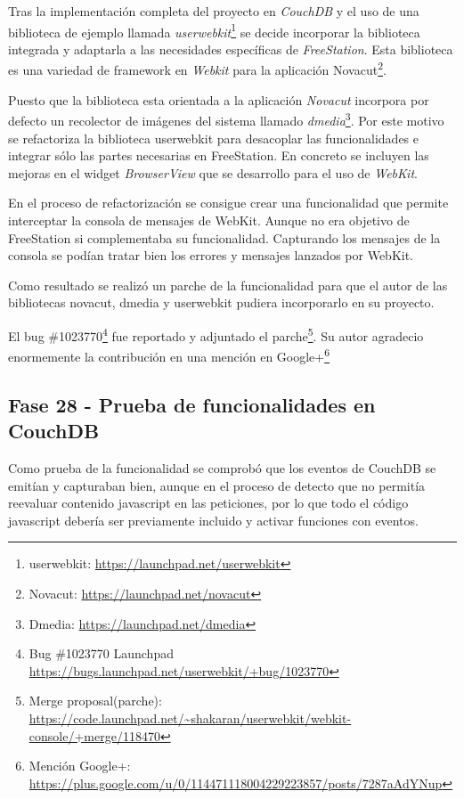 Tras la implementación completa del proyecto en \emph{CouchDB} y el uso de una
biblioteca de ejemplo llamada
\emph{userwebkit}\footnote{userwebkit: \url{https://launchpad.net/userwebkit}}
se decide incorporar la biblioteca integrada y adaptarla a las necesidades
específicas de \emph{FreeStation}.
Esta biblioteca es una variedad de framework en \emph{Webkit} para la aplicación
Novacut\footnote{Novacut: \url{https://launchpad.net/novacut}}.

Puesto que la biblioteca esta orientada a la aplicación \emph{Novacut} incorpora
por defecto un recolector de imágenes del sistema llamado
\emph{dmedia}\footnote{Dmedia: \url{https://launchpad.net/dmedia}}. Por este
motivo se refactoriza la biblioteca userwebkit para desacoplar las
funcionalidades e integrar sólo las partes necesarias en FreeStation. En
concreto se incluyen las mejoras en el widget \emph{BrowserView} que se
desarrollo para el uso de \emph{WebKit}.

En el proceso de refactorización se consigue crear una funcionalidad que permite
interceptar la consola de mensajes de WebKit. Aunque no era objetivo de
FreeStation si complementaba su funcionalidad. Capturando los mensajes de la
consola se podían tratar bien los errores y mensajes lanzados por WebKit.

Como resultado se realizó un parche de la funcionalidad para que el autor de
las bibliotecas novacut, dmedia y userwebkit pudiera incorporarlo en su proyecto.

El bug \#1023770\footnote{Bug \#1023770 Launchpad
\url{https://bugs.launchpad.net/userwebkit/+bug/1023770}} fue reportado y adjuntado el
parche\footnote{Merge proposal(parche): \\
\url{https://code.launchpad.net/~shakaran/userwebkit/webkit-console/+merge/118470}}.
Su autor agradecio enormemente la contribución en una mención en
Google+\footnote{Mención Google+:
\url{https://plus.google.com/u/0/114471118004229223857/posts/7287aAdYNup}}

\subsection{Fase 28 - Prueba de funcionalidades en CouchDB}

Como prueba de la funcionalidad se comprobó que los eventos de CouchDB se
emitían y capturaban bien, aunque en el proceso de detecto que no permitía
reevaluar contenido javascript en las peticiones, por lo que todo el código
javascript debería ser previamente incluido y activar funciones con eventos.

